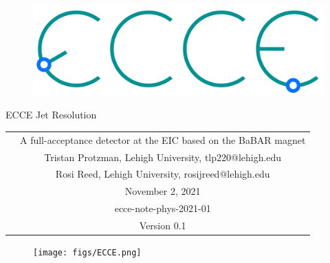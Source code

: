 \renewcommand*\familydefault{\sfdefault}
{\sffamily
\vfill
\vspace{4cm}
\begin{figure}[H]
  \begin{center}
  \includegraphics[width=0.3\linewidth]{figs/ecce-logo.png}
\end{center}
\end{figure}

\begin{center}
  \large
  {\LARGE{ECCE Jet Resolution}}
  \begin{tabular}{cc}
&A full-acceptance detector at the EIC based on the BaBAR magnet \\
&Tristan Protzman, Lehigh University, tlp220@lehigh.edu\\
&Rosi Reed, Lehigh University, rosijreed@lehigh.edu\\
&November 2, 2021 \\
&ecce-note-phys-2021-01\\
&Version 0.1
 \end{tabular}
  \end{center}
\vspace{1cm}

\begin{figure}[H]
  \begin{center}
    \texttt{[image: figs/ECCE.png]}
  \end{center}
\end{figure}
}


\renewcommand*\familydefault{\rmdefault}
